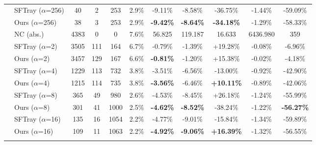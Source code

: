 \begin{table}[t]
{\begin{tabular}{ll|cccc|ccc|cc}
\addlinespace[0.3em]

 & SFTray ($\alpha$=256) & 40 & 2 & 253 & 2.9\% & -9.11\% & -8.58\% & -36.75\% & -1.44\% & -59.09\% \\

 & Ours ($\alpha$=256) & 38 & 3 & 253 & 2.9\% & \textbf{-9.42\%} & \textbf{-8.64\%} & \textbf{-34.18\%} & -1.29\% & -58.33\% \\

\addlinespace[0.3em]

\midrule

\multirow{17}{*}{jpeg} & NC (abs.) & 4383 & 0 & 0 & 7.6\% & 56.825 & 119.187 & 16.633 & 6436.980 & 359 \\

\addlinespace[0.4em]

 & SFTray ($\alpha$=2) & 3505 & 111 & 164 & 6.7\% & -0.79\% & -1.39\% & +19.28\% & -0.08\% & -6.96\% \\

 & Ours ($\alpha$=2) & 3457 & 129 & 167 & 6.6\% & \textbf{-0.81\%} & -1.20\% & +15.38\% & -0.02\% & -4.18\% \\

\addlinespace[0.3em]

 & SFTray ($\alpha$=4) & 1229 & 113 & 732 & 3.8\% & -3.51\% & -6.56\% & -13.00\% & -0.92\% & -42.90\% \\

 & Ours ($\alpha$=4) & 1215 & 114 & 735 & 3.8\% & \textbf{-3.56\%} & -6.46\% & \textbf{+10.11\%} & -0.89\% & -42.06\% \\

\addlinespace[0.3em]

 & SFTray ($\alpha$=8) & 365 & 49 & 980 & 2.6\% & -4.53\% & -8.45\% & +26.18\% & -1.24\% & -55.99\% \\

 & Ours ($\alpha$=8) & 301 & 41 & 1000 & 2.5\% & \textbf{-4.62\%} & \textbf{-8.52\%} & -38.24\% & -1.22\% & \textbf{-56.27\%} \\

\addlinespace[0.3em]

 & SFTray ($\alpha$=16) & 135 & 16 & 1054 & 2.2\% & -4.77\% & -9.01\% & -15.84\% & -1.34\% & -59.89\% \\

 & Ours ($\alpha$=16) & 109 & 11 & 1063 & 2.2\% & \textbf{-4.92\%} & \textbf{-9.06\%} & \textbf{+16.39\%} & -1.32\% & -56.55\% \\

\addlinespace[0.3em]


\end{tabular}}
\end{table}
